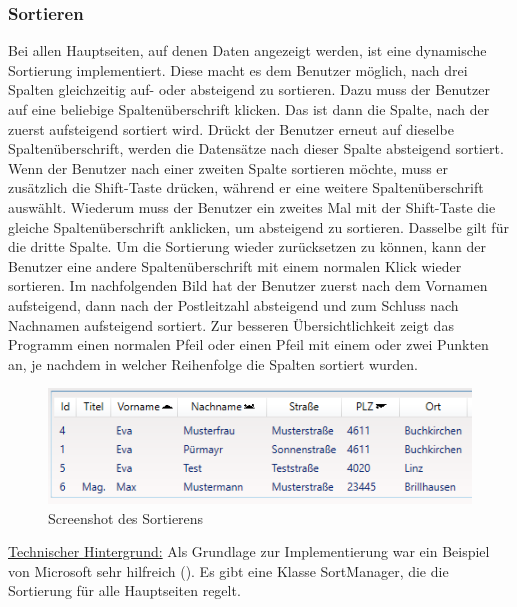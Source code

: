 \subsubsection{Sortieren}
Bei allen Hauptseiten, auf denen Daten angezeigt werden, ist eine dynamische Sortierung implementiert. Diese macht es dem Benutzer möglich, nach drei Spalten gleichzeitig auf- oder absteigend zu sortieren. \newline Dazu muss der Benutzer auf eine beliebige Spaltenüberschrift klicken. Das ist dann die Spalte, nach der zuerst aufsteigend sortiert wird. Drückt der Benutzer erneut auf dieselbe Spaltenüberschrift, werden die Datensätze nach dieser Spalte absteigend sortiert. Wenn der Benutzer nach einer zweiten Spalte sortieren möchte, muss er zusätzlich die Shift-Taste drücken, während er eine weitere Spaltenüberschrift auswählt. Wiederum muss der Benutzer ein zweites Mal mit der Shift-Taste die gleiche Spaltenüberschrift anklicken, um absteigend zu sortieren. Dasselbe gilt für die dritte Spalte. Um die Sortierung wieder zurücksetzen zu können, kann der Benutzer eine andere Spaltenüberschrift mit einem normalen Klick wieder sortieren. \newline Im nachfolgenden Bild hat der Benutzer zuerst nach dem Vornamen aufsteigend, dann nach der Postleitzahl absteigend und zum Schluss nach Nachnamen aufsteigend sortiert. Zur besseren Übersichtlichkeit zeigt das Programm einen normalen Pfeil oder einen Pfeil mit einem oder zwei Punkten an, je nachdem in welcher Reihenfolge die Spalten sortiert wurden.
\begin{figure}[H]
\begin{center}
	\includegraphics[scale=0.9]{images/Sortieren.png}
\end{center}
	\caption{Screenshot des Sortierens}
	\label{fig:sample}
\end{figure}
\noindent \underline{Technischer Hintergrund:} \linebreak
Als Grundlage zur Implementierung war ein Beispiel von Microsoft sehr hilfreich \linebreak (\cite{microsoft_windows_2017}). \newline Es gibt eine Klasse SortManager, die die Sortierung für alle Hauptseiten regelt.
